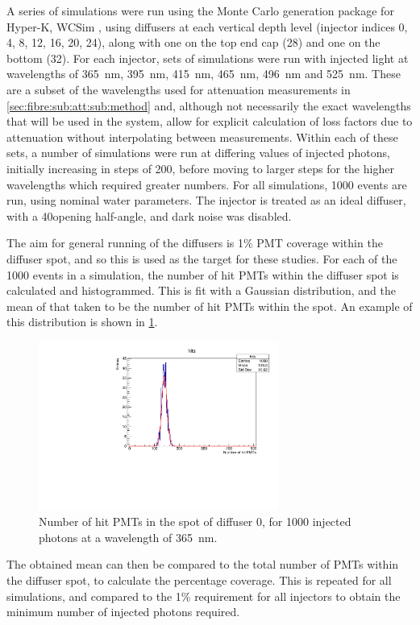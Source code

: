 \documentclass[a4paper,11pt]{article}
\begin{document}
A series of simulations were run using the Monte Carlo generation package for Hyper-K, WCSim \cite{bib:wcsim}, using diffusers at each vertical depth level (injector indices 0, 4, 8, 12, 16, 20, 24), along with one on the top end cap (28) and one on the bottom (32). For each injector, sets of simulations were run with injected light at wavelengths of 365~nm, 395~nm, 415~nm, 465~nm, 496~nm and 525~nm. These are a subset of the wavelengths used for attenuation measurements in \cref{sec:fibre:sub:att:sub:method} and, although not necessarily the exact wavelengths that will be used in the system, allow for explicit calculation of loss factors due to attenuation without interpolating between measurements. Within each of these sets, a number of simulations were run at differing values of injected photons, initially increasing in steps of 200, before moving to larger steps for the higher wavelengths which required greater numbers. For all simulations, 1000 events are run, using nominal water parameters. The injector is treated as an ideal diffuser, with a 40\degree opening half-angle, and dark noise was disabled.

The aim for general running of the diffusers is 1\% PMT coverage within the diffuser spot, and so this is used as the target for these studies. For each of the 1000 events in a simulation, the number of hit PMTs within the diffuser spot is calculated and histogrammed. This is fit with a Gaussian distribution, and the mean of that taken to be the number of hit PMTs within the spot. An example of this distribution is shown in \cref{fig:nhits_dif0_365_1000ph_plot}.
\begin{figure}[h]
\centering
\includegraphics[width=0.7\textwidth]{nhits_dif0_365_1000ph_plot.pdf}
\caption{Number of hit PMTs in the spot of diffuser 0, for 1000 injected photons at a wavelength of 365~nm.}\label{fig:nhits_dif0_365_1000ph_plot}
\end{figure}
The obtained mean can then be compared to the total number of PMTs within the diffuser spot, to calculate the percentage coverage. This is repeated for all simulations, and compared to the 1\% requirement for all injectors to obtain the minimum number of injected photons required.
\end{document}
